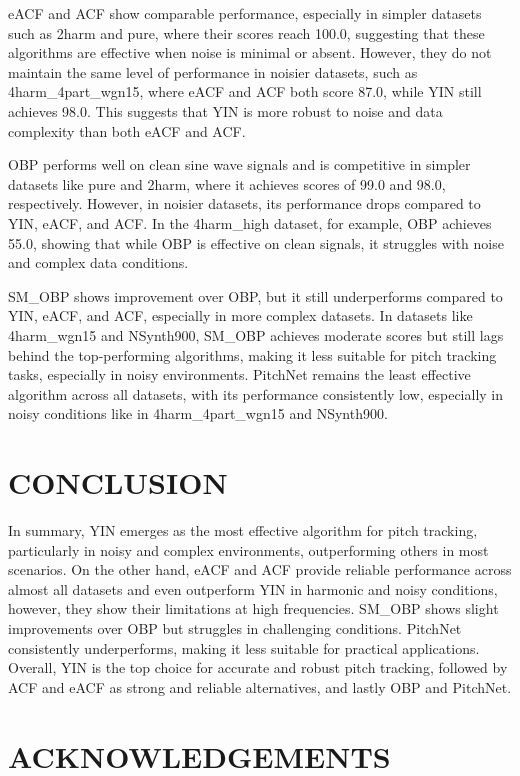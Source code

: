 \documentclass{ieeeaccess}
\begin{document}
eACF and ACF show comparable performance, especially in simpler datasets such as 2harm and pure, where their scores reach 100.0, suggesting that these algorithms are effective when noise is minimal or absent. However, they do not maintain the same level of performance in noisier datasets, such as 4harm\_4part\_wgn15, where eACF and ACF both score 87.0, while YIN still achieves 98.0. This suggests that YIN is more robust to noise and data complexity than both eACF and ACF.

OBP performs well on clean sine wave signals and is competitive in simpler datasets like pure and 2harm, where it achieves scores of 99.0 and 98.0, respectively. However, in noisier datasets, its performance drops compared to YIN, eACF, and ACF. In the 4harm\_high dataset, for example, OBP achieves 55.0, showing that while OBP is effective on clean signals, it struggles with noise and complex data conditions.

SM\_OBP shows improvement over OBP, but it still underperforms compared to YIN, eACF, and ACF, especially in more complex datasets. In datasets like 4harm\_wgn15 and NSynth900, SM\_OBP achieves moderate scores but still lags behind the top-performing algorithms, making it less suitable for pitch tracking tasks, especially in noisy environments. PitchNet remains the least effective algorithm across all datasets, with its performance consistently low, especially in noisy conditions like in 4harm\_4part\_wgn15 and NSynth900.

\section{CONCLUSION}
In summary, YIN emerges as the most effective algorithm for pitch tracking, particularly in noisy and complex environments, outperforming others in most scenarios. On the other hand, eACF and ACF provide reliable performance across almost all datasets and even outperform YIN in harmonic and noisy conditions, however, they show their limitations at high frequencies. SM\_OBP shows slight improvements over OBP but struggles in challenging conditions. PitchNet consistently underperforms, making it less suitable for practical applications. Overall, YIN is the top choice for accurate and robust pitch tracking, followed by ACF and eACF as strong and reliable alternatives, and lastly OBP and PitchNet.


\section{ACKNOWLEDGEMENTS}
\end{document}
